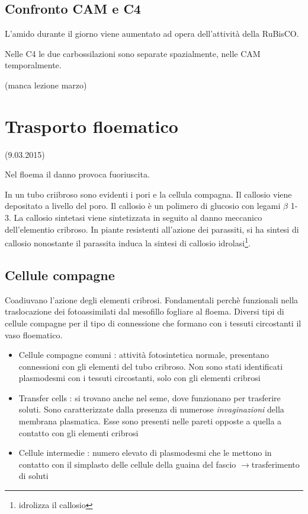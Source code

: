 \documentclass[a4paper,12pt]{book}
\newcommand{\lfreccia}{\ensuremath{\longrightarrow}}
\begin{document}
\section{Confronto CAM e C4}
L'amido durante il giorno viene aumentato ad opera dell'attività della RuBisCO. 

Nelle C4 le due carbossilazioni sono separate spazialmente, nelle CAM temporalmente.  

(manca lezione marzo)
\chapter{Trasporto floematico}
(9.03.2015)

Nel floema il danno provoca fuoriuscita.

In un tubo criibroso sono evidenti i pori e la cellula compagna. Il callosio viene depositato a livello del poro. Il callosio è un polimero di glucosio con legami $\beta$ 1-3. La callosio sintetasi viene sintetizzata in seguito al danno meccanico dell'elementio cribroso. In piante resistenti all'azione dei parassiti, si ha sintesi di callosio nonostante il parassita induca la sintesi di callosio idrolasi\footnote{idrolizza il callosio}. 

\section{Cellule compagne}
Coadiuvano l'azione degli elementi cribrosi. Fondamentali perchè funzionali nella traslocazione dei fotoassimilati dal mesofillo fogliare al floema. Diversi tipi di cellule compagne per il tipo di connessione che formano con i tessuti circostanti il vaso floematico.
\begin{itemize}
\item{Cellule compagne comuni : attività fotosintetica normale, presentano connessioni con gli elementi del tubo cribroso. Non sono stati identificati plasmodesmi con i tessuti circostanti, solo con gli elementi cribrosi}
\item{Transfer cells : si trovano anche nel seme, dove funzionano per trasferire soluti. Sono caratterizzate dalla presenza di numerose \emph{invaginazioni} della membrana plasmatica. Esse sono presenti nelle pareti opposte a quella a contatto con gli elementi cribrosi}
\item{Cellule intermedie : numero elevato di plasmodesmi che le mettono in contatto con il simplasto delle cellule della guaina del fascio \lfreccia trasferimento di soluti}
\end{itemize}
\end{document}

